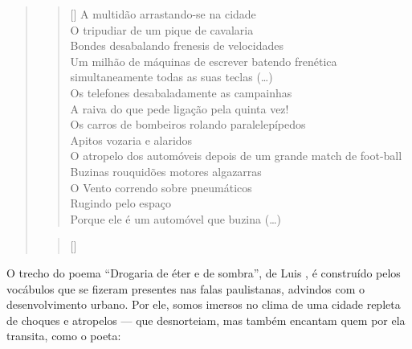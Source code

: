 \begin{refsection}
    \begin{quotation}
        \settowidth{\versewidth}{Bondes desabalando frenesis de velocidades}
        \noindent\begin{verse}[\versewidth]
            A multidão arrastando-se na cidade\\
            O tripudiar de um pique de cavalaria\\
            Bondes desabalando frenesis de velocidades\\
            Um milhão de máquinas de escrever batendo frenética simultaneamente todas as suas teclas (\dots)\\
            Os telefones desabaladamente as campainhas\\
            A raiva do que pede ligação pela quinta vez!\\
            Os carros de bombeiros rolando paralelepípedos \\
            Apitos vozaria e alaridos\\
            O atropelo dos automóveis depois de um grande match de foot-ball\\
            Buzinas rouquidões motores algazarras\\
            O Vento correndo sobre pneumáticos\\
            Rugindo pelo espaço\\
            Porque ele é um automóvel que buzina (\dots)
        \end{verse}

        \noindent\begin{verse}[\versewidth]
            \cite[p.~39--40]{Aranha1984Cocktails}
        \end{verse}
    \end{quotation}

    O trecho do poema ``Drogaria de éter e de sombra'', de Luis \textcite{Aranha1984Cocktails}, é construído pelos vocábulos que se fizeram presentes nas falas paulistanas, advindos com o desenvolvimento urbano. Por ele, somos imersos no clima de uma cidade repleta de choques e atropelos --- que desnorteiam, mas também encantam quem por ela transita, como o poeta:


\end{refsection}

